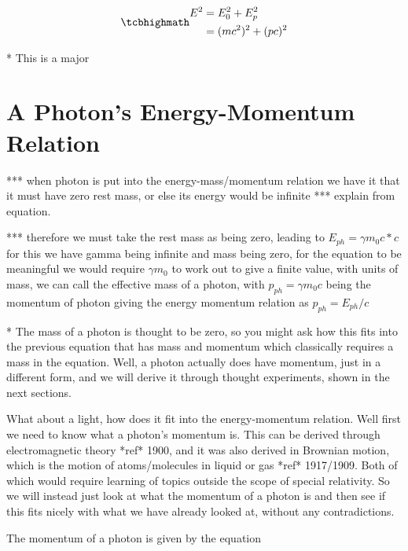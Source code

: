 \begin{equation}
	\mhl{
		\begin{aligned}
			E^2 & = E_{0}^2 + E_p^2    \\
			    & = (mc^2)^2 + (pc)^2
		\end{aligned}
	}
\end{equation}

* This is a major

\section{A Photon's Energy-Momentum Relation}\label{sect: A Photon's Energy-Momentum Relation}

*** when photon is put into the energy-mass/momentum relation we have it that it must have zero rest mass, or else its energy would be infinite *** explain from equation.

*** therefore we must take the rest mass as being zero, leading to $E_{ph}= \gamma m_0 c * c$ for this we have gamma being infinite and mass being zero, for the equation to be meaningful we would require $\gamma m_0$ to work out to give a finite value, with units of mass, we can call the effective mass of a photon, with $p_{ph}=\gamma m_0 c$ being the momentum of photon giving the energy momentum relation as $p_{ph}= E_{ph}/c$



* The mass of a photon is thought to be zero, so you might ask how this fits into the previous equation that has mass and momentum which classically requires a mass in the equation.
Well, a photon actually does have momentum, just in a different form, and we will derive it through thought experiments, shown in the next sections.

What about a light, how does it fit into the energy-momentum relation.
Well first we need to know what a photon's momentum is.
This can be derived through electromagnetic theory *ref* 1900, and it was also derived in Brownian motion, which is the motion of atoms/molecules in liquid or gas *ref* 1917/1909.
Both of which would require learning of topics outside the scope of special relativity.
So we will instead just look at what the momentum of a photon is and then see if this fits nicely with what we have already looked at, without any contradictions.

The momentum of a photon is given by the equation

